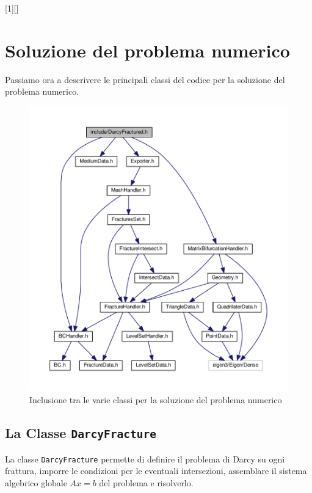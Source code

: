 [1][]{}{}

\chapter{Soluzione del problema numerico}

Passiamo ora a descrivere le principali classi del codice per la soluzione del problema numerico.

\begin{figure}[h!]
\centering
\includegraphics[scale=.59]{img/subcap3_4/DarcyFractured.pdf}
\caption{Inclusione tra le varie classi per la soluzione del problema numerico}\label{Inclusione classi DarcyFractured}
\end{figure}

\section{La Classe \texttt{DarcyFracture}}
La classe \texttt{DarcyFracture} permette di definire il problema di Darcy su ogni frattura, imporre le condizioni per le eventuali intersezioni, assemblare il sistema algebrico globale $ Ax=b $ del problema e risolverlo.\\

